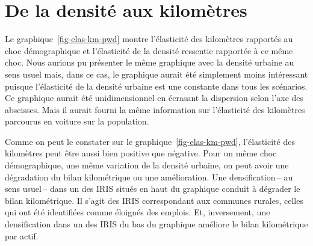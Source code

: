\documentclass[
  9pt,
  a4paper,
  DIV=11]{scrreprt}
\begin{document}
\section{De la densité aux
kilomètres}\label{de-la-densituxe9-aux-kilomuxe8tres}

Le graphique~\ref{fig-elas-km-pwd} montre l'élasticité des kilomètres
rapportés au choc démographique et l'élasticité de la densité ressentie
rapportée à ce même choc. Nous aurions pu présenter le même graphique
avec la densité urbaine au sens usuel mais, dans ce cas, le graphique
aurait été simplement moins intéressant puisque l'élasticité de la
densité urbaine est une constante dans tous les scénarios. Ce graphique
aurait été unidimensionnel en écrasant la dispersion selon l'axe des
abscisses. Mais il aurait fourni la même information sur l'élasticité
des kilomètres parcourus en voiture sur la population.

Comme on peut le constater sur le graphique~\ref{fig-elas-km-pwd},
l'élasticité des kilomètres peut être aussi bien positive que négative.
Pour un même choc démographique, une même variation de la densité
urbaine, on peut avoir une dégradation du bilan kilométrique ou une
amélioration. Une densification\,-- au sens usuel\,-- dans un des IRIS
situés en haut du graphique conduit à dégrader le bilan kilométrique. Il
s'agit des IRIS correspondant aux communes rurales, celles qui ont été
identifiées comme éloignés des emplois. Et, inversement, une
densification dans un des IRIS du bas du graphique améliore le bilan
kilométrique par actif.
\end{document}
